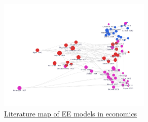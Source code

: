 \begin{figure}[!ht] \centering  %
	\caption{\href{https://app.litmaps.co/shared/0E6D51EB-462D-4F34-8BA2-27925D44DB8F}{Literature map of EE models in economics}}
	\label{fig:graph_mixer}
	\centerline{\includegraphics[width=0.65\textwidth]{./figures/graph_mixer}}
\end{figure}